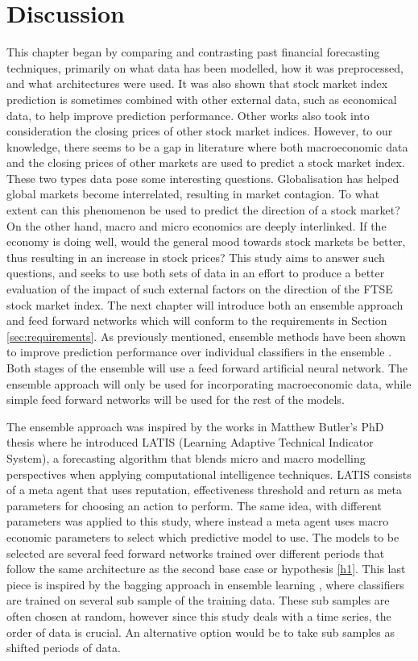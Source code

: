 \documentclass{UoYCSproject}
\begin{document}
\section{Discussion}
\label{sec:discussion}
This chapter began by comparing and contrasting past financial forecasting techniques, primarily on what data has been modelled, how it was preprocessed, and what architectures were used. It was also shown that stock market index prediction is sometimes combined with other external data, such as economical data, to help improve prediction performance. Other works also took into consideration the closing prices of other stock market indices. However, to our knowledge, there seems to be a gap in literature where both macroeconomic data and the closing prices of other markets are used to predict a stock market index. These two types data pose some interesting questions. Globalisation has helped global markets become interrelated, resulting in market contagion. To what extent can this phenomenon be used to predict the direction of a stock market? On the other hand, macro and micro economics are deeply interlinked. If the economy is doing well, would the general mood towards stock markets be better, thus resulting in an increase in stock prices? This study aims to answer such questions, and seeks to use both sets of data in an effort to produce a better evaluation of the impact of such external factors on the direction of the FTSE stock market index.   
The next chapter will introduce both an ensemble approach and feed forward networks which will conform to the requirements in Section \ref{sec:requirements}. As previously mentioned, ensemble methods have been shown to improve prediction performance over individual classifiers in the ensemble \cite{opitz1999popular}. Both stages of the ensemble will use a feed forward artificial neural network. The ensemble approach will only be used for incorporating macroeconomic data, while simple feed forward networks will be used for the rest of the models.

The ensemble approach was inspired by the works in Matthew Butler's PhD thesis \cite{butler2012computational} where he introduced LATIS (Learning Adaptive Technical Indicator System), a forecasting algorithm that blends micro and macro modelling perspectives when applying computational intelligence techniques. LATIS consists of a meta agent that uses reputation, effectiveness threshold and return as meta parameters for choosing an action to perform. The same idea, with different parameters was applied to this study, where instead a meta agent uses macro economic parameters to select which predictive model to use. The models to be selected are several feed forward networks trained over different periods that follow the same architecture as the second base case or hypothesis \ref{h1}. This last piece is inspired by the bagging approach in ensemble learning \cite{breiman1996bagging}, where classifiers are trained on several sub sample of the training data. These sub samples are often chosen at random, however since this study deals with a time series, the order of data is crucial. An alternative option would be to take sub samples as shifted periods of data.
\end{document}
